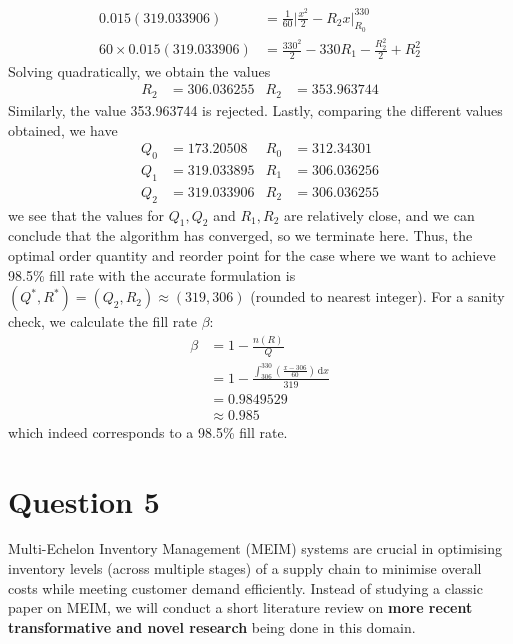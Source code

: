 \documentclass[12pt]{article}
\begin{document}
\begin{align*}
    0.015(319.033906) &= \frac{1}{60} \Big| \frac{x^{2}}{2} - R_{2}x \Big|^{330}_{R_{0}} \\ 
    60\times 0.015(319.033906) &= \frac{330^{2}}{2} - 330 R_{1} - \frac{R_{2}^{2}}{2} + R_{2}^{2} 
\end{align*} Solving quadratically, we obtain the values \begin{align*}
    R_{2} &= \mathbf{306.036255} & R_{2} &= 353.963744
\end{align*} Similarly, the value 353.963744 is rejected. Lastly, comparing the different values obtained, we have \begin{align*}
    Q_{0} &= 173.20508 & R_{0} &= 312.34301 \\ 
    Q_{1} &= 319.033895 & R_{1} &= 306.036256 \\ 
    Q_{2} &= 319.033906 & R_{2} &= 306.036255
\end{align*} we see that the values for $Q_{1}, Q_{2}$ and $R_{1}, R_{2}$ are relatively close, and we can conclude that the algorithm has converged, so we terminate here. Thus, the optimal order quantity and reorder point for the case where we want to achieve 98.5\% fill rate with the accurate formulation is $(Q^{*}, R^{*}) = (Q_{2}, R_{2}) \approx (319, 306)$ (rounded to nearest integer). For a sanity check, we calculate the fill rate $\beta$: \begin{align*}
    \beta &= 1- \frac{n(R)}{Q} \\ 
    &= 1- \frac{ \int_{306}^{330} \left( \frac{x-306}{60} \right) \, \mathrm{d}x}{319} \\ 
    &= 0.9849529 \\ 
    &\approx 0.985
\end{align*} which indeed corresponds to a 98.5\% fill rate. 

\newpage 

\section*{Question 5}


Multi-Echelon Inventory Management (MEIM) systems are crucial in optimising inventory levels (across multiple stages) of a supply chain to minimise overall costs while meeting customer demand efficiently. Instead of studying a classic paper on MEIM, we will conduct a short literature review on \textbf{more recent transformative and novel research} being done in this domain. \\
\end{document}
